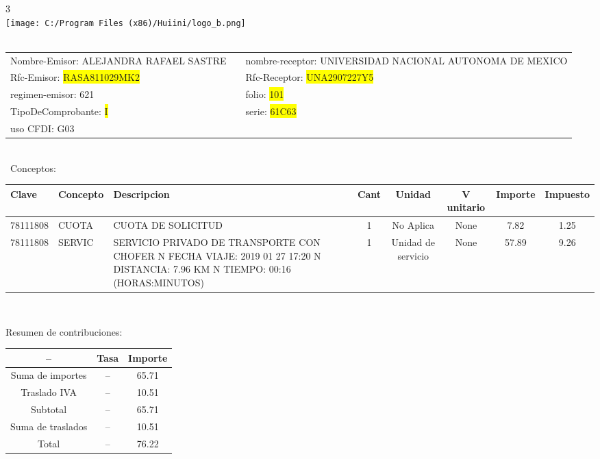 \documentclass{article}
\begin{document}
\hspace{18cm} 3\\
\texttt{[image: C:/Program Files (x86)/Huiini/logo\_b.png]}
\bigskip\\\
\begin{tabular}{p{11cm}p{1cm}p{8cm}}

Nombre-Emisor: ALEJANDRA RAFAEL SASTRE && nombre-receptor: UNIVERSIDAD NACIONAL AUTONOMA DE MEXICO\\

Rfc-Emisor: \colorbox{yellow}{ RASA811029MK2 } & & Rfc-Receptor: \colorbox{yellow}{ UNA2907227Y5 }\\

regimen-emisor: 621 & & folio: \colorbox{yellow}{ 101 }\\

TipoDeComprobante: \colorbox{yellow}{ I } & & serie: \colorbox{yellow}{ 61C63 }\\

uso CFDI: G03\\



\end{tabular}
\bigskip\bigskip\bigskip\\\
Conceptos:\\
\begin{tabular}{|p{1.5cm}|p{3.6cm}|p{3.6cm}|c|c|c|c|c|}
\hline
Clave & Concepto & Descripcion & Cant & Unidad & V unitario & Importe & Impuesto \\
\hline

78111808 & CUOTA  & CUOTA DE SOLICITUD & 1 & No Aplica & None & 7.82 &  1.25 \\
\hline

78111808 & SERVIC & SERVICIO PRIVADO DE TRANSPORTE CON CHOFER  N FECHA VIAJE: 2019 01 27 17:20  N DISTANCIA: 7.96 KM  N TIEMPO: 00:16 (HORAS:MINUTOS) & 1 & Unidad de servicio & None & 57.89 &  9.26 \\
\hline

\end{tabular}\\
\bigskip
\begin{center}
Resumen de contribuciones:\\
\bigskip
\begin{tabular}{|c|c|c|}
\hline
 -- & Tasa & Importe\\
\hline

Suma de importes & -- & 65.71 \\
\hline

Traslado IVA & -- & 10.51 \\
\hline

Subtotal  & -- & 65.71 \\
\hline

Suma de traslados & -- & 10.51 \\
\hline

Total  & -- & 76.22 \\
\hline

\end{tabular}
\end{center}
\end{document}
